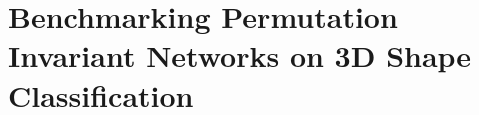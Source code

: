 \documentclass[11pt]{article}
\begin{document}
\section{ Benchmarking Permutation Invariant Networks on 3D Shape Classification}

\subsection{~}
\subsection{~}
\subsection{~}
\subsection{~}
\subsection{~}
\end{document}
